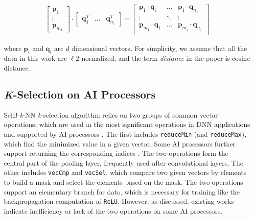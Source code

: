 \documentclass[12pt]{extbook}
\begin{document}
\begin{equation}
    \label{eq:dot_products}
    \begin{aligned}
    \begin{bmatrix} 
        \boldsymbol{p}_{1} \\
        \vdots \\
        \boldsymbol{p}_{m_1}
    \end{bmatrix}
    \cdot
    \begin{bmatrix} 
        \boldsymbol{q}_{1}^{T} &
        \dots &
        \boldsymbol{q}_{n_1}^{T}
    \end{bmatrix}
    =
    \begin{bmatrix} 
        \boldsymbol{p}_{1} \cdot \boldsymbol{q}_{1} &
        \dots &
        \boldsymbol{p}_{1} \cdot \boldsymbol{q}_{n_1} \\
        \vdots & \ddots & \vdots \\
        \boldsymbol{p}_{m_1} \cdot \boldsymbol{q}_{1} &
        \dots &
        \boldsymbol{p}_{m_1} \cdot \boldsymbol{q}_{n_1} \\
    \end{bmatrix}
    \end{aligned}
    \end{equation}

where $\boldsymbol{p}_{i}$ and $\boldsymbol{q}_{i}$ are $d$ dimensional vectors. For simplicity, we assume that all the data in this work are $\ell$2-normalized, and the term \textit{distance} in the paper is cosine distance.

\subsection{\textit{K}-Selection on AI Processors}

SelB-\textit{k}-NN \textit{k}-selection algorithm relies on two groups of common vector operations, which are used in the most significant operations in DNN applications and supported by AI processors \cite{CANN, jax, cambricon}. The first includes \verb|reduceMin| (and \verb|reduceMax|), which find the minimized value in a given vector. Some AI processors further support returning the corresponding indices \cite{CANN}. The two operations form the central part of the pooling layer, frequently used after convolutional layers. The other includes \verb|vecCmp| and \verb|vecSel|, which compare two given vectors by elements to build a mask and select the elements based on the mask. The two operations support an elementary branch for data, which is necessary for training like the backpropagation computation of \verb|ReLU|. However, as discussed, existing works \cite{DBLP:conf/icpp/JiW21, cambricon, CANN} indicate inefficiency or lack of the two operations on some AI processors.
\end{document}
